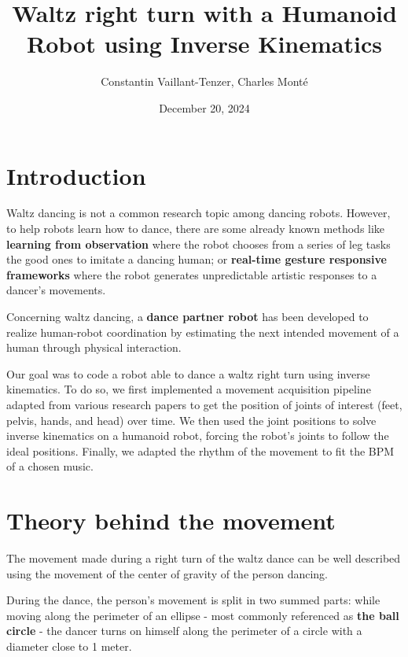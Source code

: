 \documentclass{amsart}
\date{December 20, 2024}
\title{Waltz right turn with a Humanoid Robot using Inverse Kinematics}
\author{Constantin Vaillant-Tenzer, Charles Monté}
\theoremstyle{definition}
\theoremstyle{plain}
\begin{document}
\maketitle


\section{Introduction}


Waltz dancing is not a common research topic among dancing robots. However, to help robots learn how to dance, there are some already known methods like \textbf{learning from observation}\cite{traditional_jap_dance} where the robot chooses from a series of leg tasks the good ones to imitate a dancing human; or \textbf{real-time gesture responsive frameworks}\cite{spectacle_imitation} where the robot generates unpredictable artistic responses to a dancer's movements.

Concerning waltz dancing, a \textbf{dance partner robot}\cite{ballroom_dance} has been developed to realize human-robot coordination by estimating the next intended movement of a human through physical interaction.

Our goal was to code a robot able to dance a waltz right turn using inverse kinematics. To do so, we first implemented a movement acquisition pipeline adapted from various research papers to get the position of joints of interest (feet, pelvis, hands, and head) over time. We then used the joint positions to solve inverse kinematics on a humanoid robot, forcing the robot's joints to follow the ideal positions. Finally, we adapted the rhythm of the movement to fit the BPM of a chosen music.




\section{Theory behind the movement}


The movement made during a right turn of the waltz dance can be well described using the movement of the center of gravity of the person dancing. 

During the dance, the person's movement is split in two summed parts: while moving along the perimeter of an ellipse - most commonly referenced as \textbf{the ball circle} - the dancer turns on himself along the perimeter of a circle with a diameter close to 1 meter.
\end{document}
